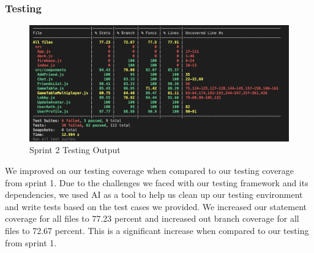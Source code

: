 \subsubsection {Testing}
\begin{figure}[h]
    \centering
    \includegraphics[width=1\linewidth]{figures/Testing.png}
    \caption{Sprint 2 Testing Output}
    \label{fig:enter-label}
\end{figure}

We improved on our testing coverage when compared to our testing coverage from sprint 1. Due to the challenges we faced with our testing framework and its dependencies, we used AI as a tool to help us clean up our testing environment and write tests based on the test cases we provided. We increased our statement coverage for all files to 77.23 percent and increased out branch coverage for all files to 72.67 percent. This is a significant increase when compared to our testing from sprint 1. 
     



